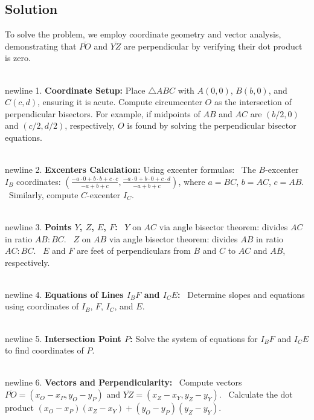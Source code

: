 \documentclass{article}
\begin{document}
\subsection*{Solution}
To solve the problem, we employ coordinate geometry and vector analysis, demonstrating that \(\overline{PO}\) and \(\overline{YZ}\) are perpendicular by verifying their dot product is zero.

\\newline 1. \textbf{Coordinate Setup:}
   Place \(\triangle ABC\) with \(A(0,0)\), \(B(b,0)\), and \(C(c,d)\), ensuring it is acute. Compute circumcenter \(O\) as the intersection of perpendicular bisectors. For example, if midpoints of \(AB\) and \(AC\) are \((b/2,0)\) and \((c/2,d/2)\), respectively, \(O\) is found by solving the perpendicular bisector equations.

\\newline 2. \textbf{Excenters Calculation:}
   Using excenter formulas:
\noindent \textbullet\ The \(B\)-excenter \(I_B\) coordinates: \(\left(\frac{-a \cdot 0 + b \cdot b + c \cdot c}{-a + b + c}, \frac{-a \cdot 0 + b \cdot 0 + c \cdot d}{-a + b + c}\right)\), where \(a = BC\), \(b = AC\), \(c = AB\).
\noindent \textbullet\ Similarly, compute \(C\)-excenter \(I_C\).

\\newline 3. \textbf{Points \(Y\), \(Z\), \(E\), \(F\):}
\noindent \textbullet\ \(Y\) on \(AC\) via angle bisector theorem: divides \(AC\) in ratio \(AB:BC\).
\noindent \textbullet\ \(Z\) on \(AB\) via angle bisector theorem: divides \(AB\) in ratio \(AC:BC\).
\noindent \textbullet\ \(E\) and \(F\) are feet of perpendiculars from \(B\) and \(C\) to \(AC\) and \(AB\), respectively.

\\newline 4. \textbf{Equations of Lines \(I_BF\) and \(I_CE\):}
\noindent \textbullet\ Determine slopes and equations using coordinates of \(I_B\), \(F\), \(I_C\), and \(E\).

\\newline 5. \textbf{Intersection Point \(P\):}
   Solve the system of equations for \(I_BF\) and \(I_CE\) to find coordinates of \(P\).

\\newline 6. \textbf{Vectors and Perpendicularity:}
\noindent \textbullet\ Compute vectors \(\overline{PO} = (x_O - x_P, y_O - y_P)\) and \(\overline{YZ} = (x_Z - x_Y, y_Z - y_Y)\).
\noindent \textbullet\ Calculate the dot product \((x_O - x_P)(x_Z - x_Y) + (y_O - y_P)(y_Z - y_Y)\).
\end{document}
